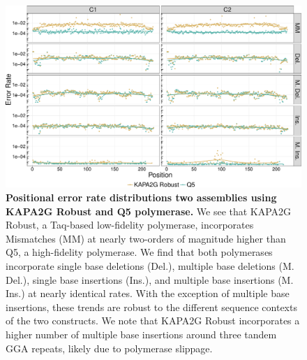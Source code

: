 \documentclass[letterpaper,12pt]{article}
\begin{document}
\clearpage
\begin{figure}[t]
\centering
\includegraphics[width=174mm]{review-errs-pos-1.pdf}
\caption{\small \textbf{Positional error rate distributions two assemblies using KAPA2G Robust and Q5 polymerase.} We see that KAPA2G Robust, a Taq-based low-fidelity polymerase, incorporates Mismatches (MM) at nearly two-orders of magnitude higher than Q5, a high-fidelity polymerase. We find that both polymerases incorporate single base deletions (Del.), multiple base deletions (M. Del.), single base insertions (Ins.), and multiple base insertions (M. Ins.) at nearly identical rates. With the exception of multiple base insertions, these trends are robust to the different sequence contexts of the two constructs. We note that KAPA2G Robust incorporates a higher number of multiple base insertions around three tandem GGA repeats, likely due to polymerase slippage.}
\end{figure}
\end{document}
